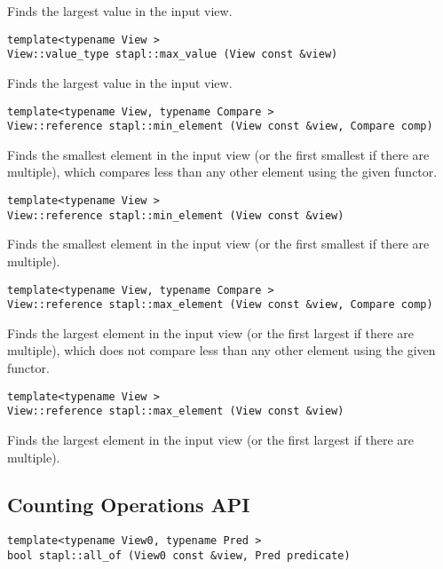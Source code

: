 Finds the largest value in the input view.

\begin{verbatim}
template<typename View >
View::value_type stapl::max_value (View const &view)
\end{verbatim}

Finds the largest value in the input view.

\begin{verbatim}
template<typename View, typename Compare >
View::reference stapl::min_element (View const &view, Compare comp)
\end{verbatim}

Finds the smallest element in the input view (or the first smallest if there are multiple), which compares less than any other element using the given functor.

\begin{verbatim}
template<typename View >
View::reference stapl::min_element (View const &view)
\end{verbatim}

Finds the smallest element in the input view (or the first smallest if there are multiple).

\begin{verbatim}
template<typename View, typename Compare >
View::reference stapl::max_element (View const &view, Compare comp)
\end{verbatim}

Finds the largest element in the input view (or the first largest if there are multiple), which does not compare less than any other element using the given functor.

\begin{verbatim}
template<typename View >
View::reference stapl::max_element (View const &view)
\end{verbatim}

Finds the largest element in the input view (or the first largest if there are multiple).


\subsection{Counting Operations API} \label{sec-count-alg}

\begin{verbatim}
template<typename View0, typename Pred >
bool stapl::all_of (View0 const &view, Pred predicate)
\end{verbatim}

